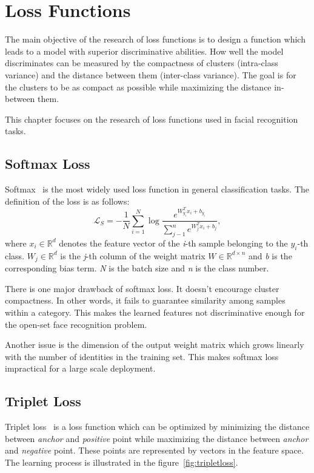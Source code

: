 \chapter{Loss Functions}\label{ch:loss-functions}
The main objective of the research of loss functions is to design a function which leads to a model with superior
discriminative abilities.
How well the model discriminates can be measured by the compactness of clusters (intra-class variance) and the
distance between them (inter-class variance).
The goal is for the clusters to be as compact as possible while maximizing the distance in-between them.

This chapter focuses on the research of loss functions used in facial recognition tasks.

\section{Softmax Loss}\label{sec:softmax-loss}
Softmax~\cite{ArcFace} is the most widely used loss function in general classification tasks.
The definition of the loss is as follows:
\begin{equation}
    \label{eq:softmax}
    \mathcal{L}_S = -\frac{1}{N} \sum_{i=1}^{N} \log \frac{e^{W^T_{y_i} x_{i} + b_{y_i}}}
    {\sum_{j-1}^{n} e^{W^T_{j} x_{i} + b_{j}}},
\end{equation}
where $x_i \in \mathbb{R}^{d}$ denotes the feature vector of the \textit{i}-th sample belonging to the $y_i$-th class.
$W_j \in \mathbb{R}^{d}$ is the \textit{j}-th column of the weight matrix $W \in \mathbb{R}^{d \times n}$ and \textit{b}
is the corresponding bias term.
\textit{N} is the batch size and \textit{n} is the class number.

There is one major drawback of softmax loss.
It doesn't encourage cluster compactness.
In other words, it fails to guarantee similarity among samples within a category.
This makes the learned features not discriminative enough for the open-set face recognition
problem.

Another issue is the dimension of the output weight matrix which grows linearly with the number of identities in the
training set.
This makes softmax loss impractical for a large scale deployment.

\section{Triplet Loss}\label{sec:triplet-loss}
Triplet loss~\cite{TripletLoss} is a loss function which can be optimized by minimizing the distance between
\textit{anchor} and \textit{positive} point while maximizing the distance between \textit{anchor} and \textit{negative}
point.
These points are represented by vectors in the feature space.
The learning process is illustrated in the figure~\ref{fig:tripletloss}.

